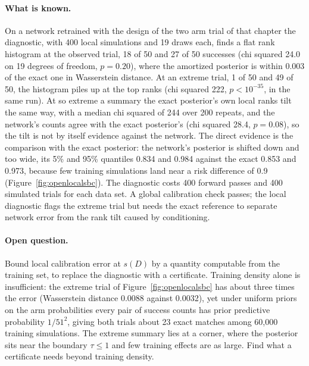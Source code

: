 \paragraph{What is known.} On a network retrained with the design of the two arm trial of that chapter the diagnostic, with 400 local simulations and 19 draws each, finds a flat rank histogram at the observed trial, 18 of 50 and 27 of 50 successes (chi squared 24.0 on 19 degrees of freedom, $p = 0.20$), where the amortized posterior is within 0.003 of the exact one in Wasserstein distance. At an extreme trial, 1 of 50 and 49 of 50, the histogram piles up at the top ranks (chi squared 222, $p < 10^{-35}$, in the same run). At so extreme a summary the exact posterior's own local ranks tilt the same way, with a median chi squared of 244 over 200 repeats, and the network's counts agree with the exact posterior's (chi squared 28.4, $p = 0.08$), so the tilt is not by itself evidence against the network. The direct evidence is the comparison with the exact posterior: the network's posterior is shifted down and too wide, its 5\% and 95\% quantiles 0.834 and 0.984 against the exact 0.853 and 0.973, because few training simulations land near a risk difference of 0.9 (Figure~\ref{fig:openlocalsbc}). The diagnostic costs 400 forward passes and 400 simulated trials for each data set. A global calibration check passes; the local diagnostic flags the extreme trial but needs the exact reference to separate network error from the rank tilt caused by conditioning.

\paragraph{Open question.} Bound local calibration error at $s(D)$ by a quantity computable from the training set, to replace the diagnostic with a certificate. Training density alone is insufficient: the extreme trial of Figure~\ref{fig:openlocalsbc} has about three times the error (Wasserstein distance 0.0088 against 0.0032), yet under uniform priors on the arm probabilities every pair of success counts has prior predictive probability $1/51^2$, giving both trials about 23 exact matches among 60{,}000 training simulations. The extreme summary lies at a corner, where the posterior sits near the boundary $\tau \le 1$ and few training effects are as large. Find what a certificate needs beyond training density.

